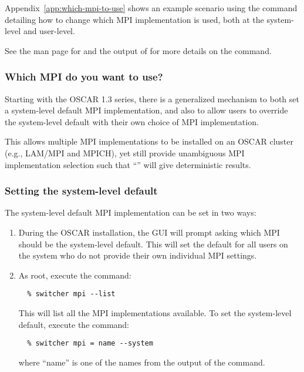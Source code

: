 Appendix~\ref{app:which-mpi-to-use} shows an example scenario using
the  command detailing how to change which MPI
implementation is used, both at the system-level and user-level.

See the man page for  and the output of  for more details on the  command.


\subsubsection{Which MPI do you want to use?}
\label{app:switcher-which-mpi-to-use}

Starting with the OSCAR 1.3 series, there is a generalized mechanism
to both set a system-level default MPI implementation, and also to
allow users to override the system-level default with their own choice
of MPI implementation.

This allows multiple MPI implementations to be installed on an OSCAR
cluster (e.g., LAM/MPI and MPICH), yet still provide unambiguous MPI
implementation selection such that ``'' will
give deterministic results.

\subsubsection{Setting the system-level default}

The system-level default MPI implementation can be set in two ways:

\begin{enumerate}
\item During the OSCAR installation, the GUI will prompt asking which
  MPI should be the system-level default.  This will set the default
  for all users on the system who do not provide their own individual
  MPI settings.

\item As root, execute the command:

\begin{verbatim}
  % switcher mpi --list
\end{verbatim}

   This will list all the MPI implementations available.  To set the
   system-level default, execute the command:

\begin{verbatim}
  % switcher mpi = name --system
\end{verbatim}
   
   where ``name'' is one of the names from the output of the
    command.
\end{enumerate}

